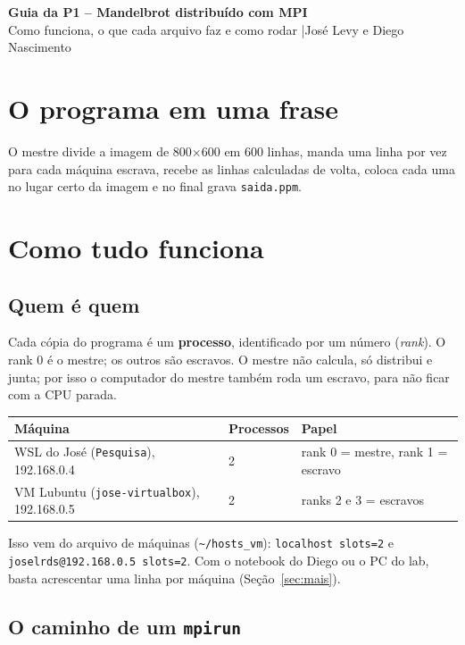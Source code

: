 \documentclass[a4paper,11pt]{article}
\begin{document}
{\LARGE \textbf{Guia da P1 -- Mandelbrot distribuído com MPI}}\\[2pt]
{\large Como funciona, o que cada arquivo faz e como rodar \quad|\quad José Levy e Diego Nascimento}

\tableofcontents

\section{O programa em uma frase}

O mestre divide a imagem de 800$\times$600 em 600 linhas, manda uma linha por vez para cada máquina escrava, recebe as linhas calculadas de volta, coloca cada uma no lugar certo da imagem e no final grava \texttt{saida.ppm}.

\section{Como tudo funciona}

\subsection{Quem é quem}

Cada cópia do programa é um \textbf{processo}, identificado por um número (\textit{rank}). O rank 0 é o mestre; os outros são escravos. O mestre não calcula, só distribui e junta; por isso o computador do mestre também roda um escravo, para não ficar com a CPU parada.

\begin{center}
\begin{tabular}{|l|l|l|}
\hline
\textbf{Máquina} & \textbf{Processos} & \textbf{Papel} \\ \hline
WSL do José (\texttt{Pesquisa}), 192.168.0.4 & 2 & rank 0 = mestre, rank 1 = escravo \\ \hline
VM Lubuntu (\texttt{jose-virtualbox}), 192.168.0.5 & 2 & ranks 2 e 3 = escravos \\ \hline
\end{tabular}
\end{center}

Isso vem do arquivo de máquinas (\texttt{\textasciitilde/hosts\_vm}): \texttt{localhost slots=2} e \texttt{joselrds@192.168.0.5 slots=2}. Com o notebook do Diego ou o PC do lab, basta acrescentar uma linha por máquina (Seção~\ref{sec:mais}).

\subsection{O caminho de um \texttt{mpirun}}
\end{document}
